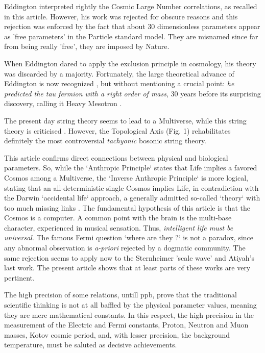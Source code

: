 \documentclass[twoside,draft]{article}
\begin{document}
\begin{sloppypar}
Eddington interpreted rightly the Cosmic Large Number correlations, as recalled in this article. However, his work was rejected for obscure reasons and this rejection was enforced by the fact that about 30 dimensionless parameters appear as 'free parameters' in the Particle standard model. They are misnamed since far from being really 'free', they are imposed by Nature. 

When Eddington\cite{Eddington} dared to apply the exclusion principle in cosmology, his theory was discarded by a majority. Fortunately, the large theoretical advance of Eddington is now recognized \cite{Durham}, but without mentioning a crucial point: \textit{he predicted the tau fermion with a right order of mass}, 30 years before its surprising discovery, calling it Heavy Mesotron \cite{Eddington}. 

The present day string theory seems to lead to a Multiverse, while this string theory is criticised \cite{Woigt}. However, the Topological Axis (Fig. 1) rehabilitates definitely the most controversial \textit{tachyonic} bosonic string theory.

This article confirms direct connections \cite{Sanchez1} between physical and biological parameters. So, while the `Anthropic Principle` states that Life implies a favored Cosmos among a Multiverse, the `Inverse Anthropic Principle` is more logical, stating that an all-deterministic single Cosmos implies Life, in contradiction with the Darwin `accidental life` approach, a generally admitted so-called `theory` with too much missing links \cite{Chauvin}. The fundamental hypothesis of this article is that the Cosmos is a computer. A common point with the brain is the multi-base character, experienced in musical sensation. Thus, \textit{intelligent life must be universal}. The famous Fermi question `where are they ?` is not a paradox, since any abnormal observation is \textit{a-priori} rejected by a dogmatic community. The same rejection seems to apply now to the Sternheimer 'scale wave' and Atiyah's last work. The present article shows that at least parts of these works are very pertinent.

The high precision of some relations, untill ppb, prove that the traditional scientific thinking is not at all baffled by
the physical parameter values, meaning they are mere mathematical constants. In this respect, the
high precision in the measurement of the Electric and Fermi constants, Proton, Neutron and Muon masses, Kotov cosmic period, and, with lesser precision, the background temperature, must be saluted as decisive achievements.


\end{sloppypar}
\end{document}
